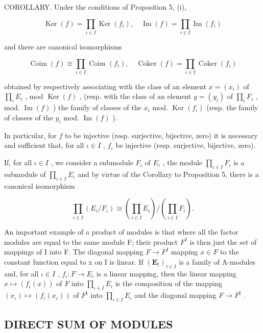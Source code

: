 COROLLARY. Under the conditions of Proposition 5, (i),

\[
\operatorname{Ker} (f) = \prod_ {i \in I} \operatorname{Ker} (f _ {i}), \quad \operatorname{Im} (f) = \prod_ {i \in I} \operatorname{Im} (f _ {i})\tag{18}
\]

and there are canonical isomorphisms

\[
\operatorname{Coim} (f) \cong \prod_ {i \in I} \operatorname{Coim} (f _ {i}), \quad \operatorname{Coker} (f) = \prod_ {i \in I} \operatorname{Coker} (f _ {i})
\]

obtained by respectively associating with the class of an element \(x = (x_{i})\) of \(\prod_{i} E_{i}\) , mod \(\operatorname{Ker}(f)\) , (resp. with the class of an element \(y = (y_{i})\) of \(\prod_{i} F_{i}\) , mod. \(\operatorname{Im}(f)\) ) the family of classes of the \(x_{i}\) mod. \(\operatorname{Ker}(f_{i})\) (resp. the family of classes of the \(y_{i}\) mod. \(\operatorname{Im}(f)\) ).

In particular, for \(f\) to be injective (resp. surjective, bijective, zero) it is necessary and sufficient that, for all \(\iota \in I\) , \(f_{\iota}\) be injective (resp. surjective, bijective, zero).

If, for all \(\iota \in I\) , we consider a submodule \(F_{\iota}\) of \(E_{\iota}\) , the module \(\prod_{\iota \in I} F_{\iota}\) is a submodule of \(\prod_{\iota \in I} E_{\iota}\) and by virtue of the Corollary to Proposition 5, there is a canonical isomorphism

\[
\prod_ {i \in I} \left(E _ {i} / F _ {i}\right)\cong \left(\prod_ {i \in I} E _ {i}\right) / \left(\prod_ {i \in I} F _ {i}\right).\tag{19}
\]

An important example of a product of modules is that where all the factor modules are equal to the same module F; their product \(F^{I}\) is then just the set of mappings of I into F. The diagonal mapping \(F \rightarrow F^{I}\) mapping \(x \in F\) to the constant function equal to x on I is linear. If \((\mathbf{E}_{t})_{t \in I}\) is a family of A-modules and, for all \(\iota \in I\) , \(f_{\iota}: F \to E_{\iota}\) is a linear mapping, then the linear mapping \(x \mapsto (f_{\iota}(x))\) of \(F\) into \(\prod_{\iota \in I} E_{\iota}\) is the composition of the mapping \((x_{\iota}) \mapsto (f_{\iota}(x_{\iota}))\) of \(F^{\mathrm{I}}\) into \(\prod_{\iota \in I} E_{\iota}\) and the diagonal mapping \(F \to F^{\mathrm{I}}\) .

\subsection{DIRECT SUM OF MODULES}

